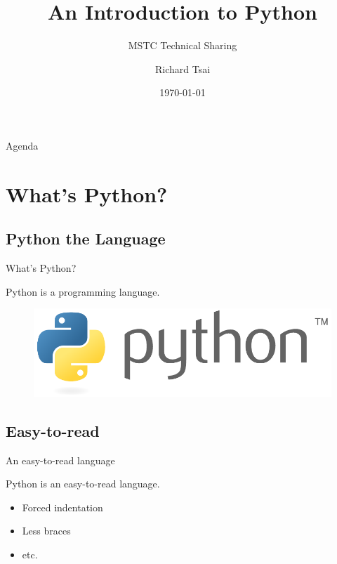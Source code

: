 \documentclass{beamer}
\begin{document}
\title{An Introduction to Python}
\subtitle{MSTC Technical Sharing}
\author{Richard Tsai}
\date{\today}

\begin{frame}[plain]
\titlepage
\end{frame}

\begin{frame}{Agenda}
 \tableofcontents
\end{frame}

\section{What's Python?}
\subsection{Python the Language}
\begin{frame}{What's Python?}
 \begin{block}{Python is a programming language.}
  \begin{figure}[htb!]
   \includegraphics[scale=0.5]{python-logo-generic}\footnotemark
  \end{figure}
 \end{block}
\end{frame}

\subsection{Easy-to-read}
\begin{frame}{An easy-to-read language}
 \begin{block}{Python is an easy-to-read language.}\pause
  \begin{itemize}
   \item Forced indentation\pause
   \item Less braces\pause
   \item etc.
  \end{itemize}
 \end{block}
\end{frame}
\end{document}
